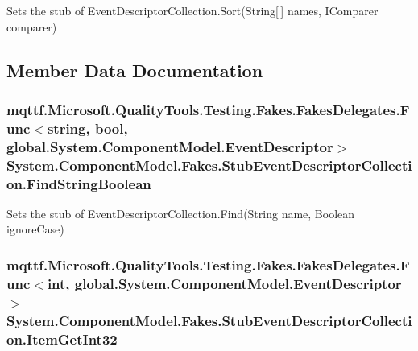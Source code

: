 Sets the stub of Event\-Descriptor\-Collection.\-Sort(\-String\mbox{[}$\,$\mbox{]} names, I\-Comparer comparer)



\subsection{Member Data Documentation}
\hypertarget{class_system_1_1_component_model_1_1_fakes_1_1_stub_event_descriptor_collection_af092cf52e27bd09029a642e2c94b8853}{
\subsubsection[{Find\-String\-Boolean}]{\setlength{\rightskip}{0pt plus 5cm}mqttf.\-Microsoft.\-Quality\-Tools.\-Testing.\-Fakes.\-Fakes\-Delegates.\-Func$<$string, bool, global.\-System.\-Component\-Model.\-Event\-Descriptor$>$ System.\-Component\-Model.\-Fakes.\-Stub\-Event\-Descriptor\-Collection.\-Find\-String\-Boolean}}\label{class_system_1_1_component_model_1_1_fakes_1_1_stub_event_descriptor_collection_af092cf52e27bd09029a642e2c94b8853}


Sets the stub of Event\-Descriptor\-Collection.\-Find(\-String name, Boolean ignore\-Case)

\hypertarget{class_system_1_1_component_model_1_1_fakes_1_1_stub_event_descriptor_collection_a0ddaa1be93c062dc555135f844e35af0}{
\subsubsection[{Item\-Get\-Int32}]{\setlength{\rightskip}{0pt plus 5cm}mqttf.\-Microsoft.\-Quality\-Tools.\-Testing.\-Fakes.\-Fakes\-Delegates.\-Func$<$int, global.\-System.\-Component\-Model.\-Event\-Descriptor$>$ System.\-Component\-Model.\-Fakes.\-Stub\-Event\-Descriptor\-Collection.\-Item\-Get\-Int32}}\label{class_system_1_1_component_model_1_1_fakes_1_1_stub_event_descriptor_collection_a0ddaa1be93c062dc555135f844e35af0}


